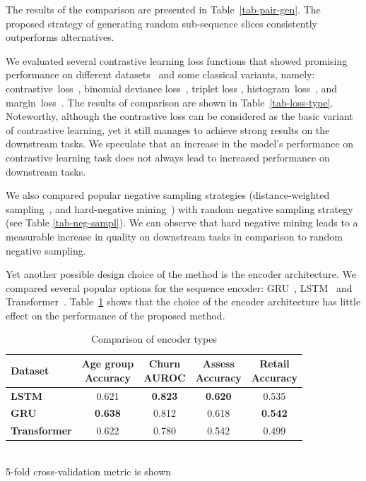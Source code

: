 \documentclass[sigconf]{acmart}
\newcommand{\revised}[1]{#1}
\begin{document}
The results of the comparison are presented in Table~\ref{tab-pair-gen}. The proposed strategy
of generating random sub-sequence slices consistently outperforms alternatives.

\revised{
    We evaluated several contrastive learning loss functions that showed promising
    performance on different datasets~\citep{Kaya2019DeepML} and some classical variants, namely: 
    contrastive~loss~\citep{Hadsell2006DimensionalityRB}, binomial deviance loss~\citep{Yi2014DeepML},
    triplet loss \citep{Hoffer2015DeepML}, histogram~loss~\citep{Ustinova2016LearningDE}, and
    margin~loss~\citep{Manmatha2017SamplingMI}. The results of comparison are shown in Table~\ref{tab-loss-type}.
    Noteworthy, although the contrastive loss can be considered as the basic variant of
    contrastive learning, yet it still manages to achieve strong results on the downstream tasks.
    We speculate that an increase in the model's performance on contrastive learning task does
    not always lead to increased performance on downstream tasks.
}

We also compared popular negative sampling strategies (distance-weighted sampling~\citep{Manmatha2017SamplingMI},
and hard-negative mining~\citep{Schroff2015FaceNetAU}) with random negative sampling strategy (see
Table \ref{tab-neg-sampl}).
% 
We can observe that hard negative mining leads to a measurable increase in quality on downstream
tasks in comparison to random negative sampling.

\revised{
Yet another possible design choice of the method is the encoder architecture. We compared
several popular options for the sequence encoder: GRU~\citep{Cho2014OnTP}, LSTM~\citep{Hochreiter1997LongSM} and Transformer~\citep{Vaswani2017AttentionIA}. Table~\ref{tab-enc-type} shows that the choice of
the encoder architecture has little effect on the performance of the proposed method.
}

\begin{table}
    \centering
    \caption{Comparison of encoder types}
    \begin{tabular}{lcccc}
        \toprule
        \textbf{Dataset} &
            \makecell{\textbf{Age group} \\ \small{Accuracy}} &
            \makecell{\textbf{Churn} \\ \small{AUROC}} &
            \makecell{\textbf{Assess} \\ \small{Accuracy}} &
            \makecell{\textbf{Retail} \\ \small{Accuracy}} \\
        \midrule
            \textbf{LSTM} & 0.621 & \textbf{0.823} & \textbf{0.620} & 0.535 \\
            \textbf{GRU} & \textbf{0.638} & 0.812 & 0.618 & \textbf{0.542} \\
            \textbf{Transformer} & 0.622 & 0.780 & 0.542 & 0.499 \\
        \bottomrule
    \end{tabular}%
    \\
    \small{5-fold cross-validation metric is shown}
    \label{tab-enc-type}
\end{table}
\end{document}
